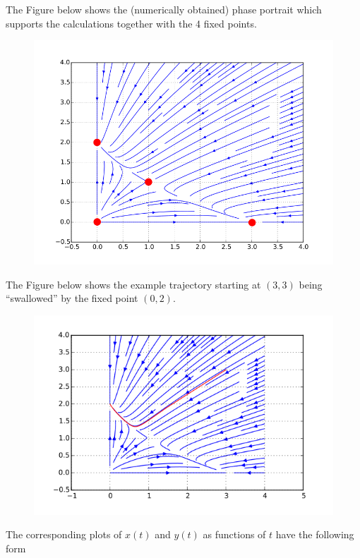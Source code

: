 The Figure below shows the (numerically obtained) phase portrait which supports the calculations together with the 4 fixed points.

\begin{figure}[H]
\includegraphics[scale=0.7]{images/strogatz_1_2.png}
\end{figure}

The Figure below shows the example trajectory starting at $(3,3)$ being ``swallowed'' by the fixed point $(0,2)$.

\begin{figure}[H]
\includegraphics[scale=0.7]{images/strogatz_1_3.png}
\end{figure}

The corresponding plots of $x(t)$ and $y(t)$ as functions of
$t$ have the following form


